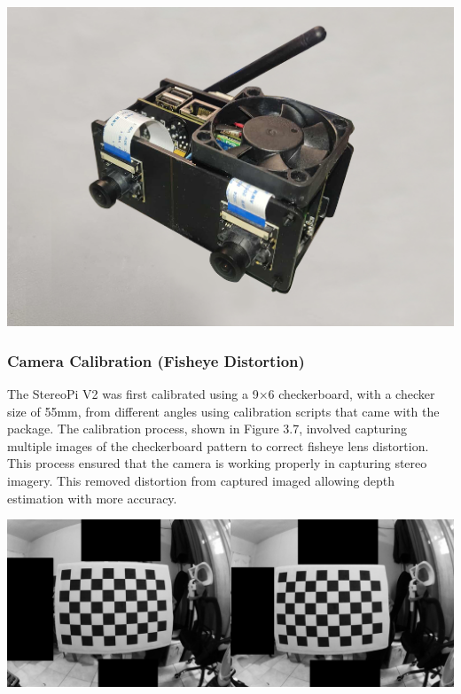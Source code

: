 \begin{center}
	\includegraphics[scale=0.12]{prototype.png}
\end{center}


\subsubsection{Camera Calibration (Fisheye Distortion)}
The StereoPi V2 was first calibrated using a 9×6 checkerboard, with a checker size of 55mm, from different angles using calibration scripts that came with the package. The calibration process, shown in Figure 3.7, involved capturing multiple images of the checkerboard pattern to correct fisheye lens distortion. This process ensured that the camera is working properly in capturing stereo imagery. This removed distortion from captured imaged allowing depth estimation with more accuracy.

\begin{center}
	\includegraphics[scale=0.25]{calibration.png}
\end{center}

